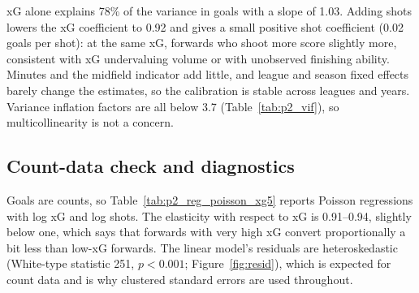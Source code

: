 \documentclass[11pt,a4paper]{article}
\begin{document}
xG alone explains 78\% of the variance in goals with a slope of 1.03. Adding shots lowers the xG coefficient to 0.92 and gives a small positive shot coefficient (0.02 goals per shot): at the same xG, forwards who shoot more score slightly more, consistent with xG undervaluing volume or with unobserved finishing ability. Minutes and the midfield indicator add little, and league and season fixed effects barely change the estimates, so the calibration is stable across leagues and years. Variance inflation factors are all below 3.7 (Table~\ref{tab:p2_vif}), so multicollinearity is not a concern.

\begin{table}

\caption{\label{tab:p2_vif}Variance inflation factors}
\centering
{}
\end{table}

\subsection{Count-data check and diagnostics}

Goals are counts, so Table~\ref{tab:p2_reg_poisson_xg5} reports Poisson regressions with log xG and log shots. The elasticity with respect to xG is 0.91--0.94, slightly below one, which says that forwards with very high xG convert proportionally a bit less than low-xG forwards. The linear model's residuals are heteroskedastic (White-type statistic 251, $p<0.001$; Figure~\ref{fig:resid}), which is expected for count data and is why clustered standard errors are used throughout.
\end{document}
